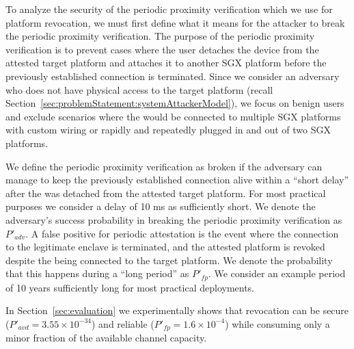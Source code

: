 \parasaver
{}
To analyze the security of the periodic proximity verification which we use for platform revocation, we must first define what it means for the attacker to break the periodic proximity verification. The purpose of the periodic proximity verification is to prevent cases where the user detaches the \device device from the attested target platform and attaches it to another SGX platform before the previously established connection is terminated. Since we consider an adversary who does not have physical access to the target platform (recall Section~\ref{sec:problemStatement:systemAttackerModel}), we focus on benign users and exclude scenarios where the \device would be connected to multiple SGX platforms with custom wiring or rapidly and repeatedly plugged in and out of two SGX platforms.



We define the periodic proximity verification as broken if the adversary can manage to keep the previously established connection alive within a ``short delay'' after the \device was detached from the attested target platform. For most practical purposes we consider a delay of 10 ms as sufficiently short. We denote the adversary's success probability in breaking the periodic proximity verification as $P'_{adv}$.
%
A false positive for periodic attestation is the event where the connection to the legitimate enclave is terminated, and the attested platform is revoked despite the \device being connected to the target platform. We denote the probability that this happens during a ``long period'' as $P'_{fp}$. We consider an example period of 10 years sufficiently long for most practical deployments.

In Section~\ref{sec:evaluation} we experimentally shows that revocation can be secure ($P'_{avd}=3.55\times10^{-34}$) and reliable
($P'_{fp}=1.6\times10^{-4}$) while consuming only a minor fraction of the available channel capacity.


